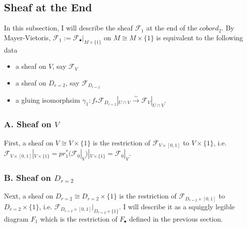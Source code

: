 \subsection{Sheaf at the End}
In this subsection, I will describe the sheaf $\mathscr{F}_1$ at the end of the $cobord_2$. By Mayer-Vietoris, $\mathscr{F}_1:= \mathscr{F}_\bullet|_{M\times\{1\}}$ on $M \cong M\times\{1\}$ is equivalent to the following data
\begin{itemize}
\item a sheaf on $V$, say $\mathscr{F}_{V}$

\item a sheaf on $D_{r=2}$, say $\mathscr{F}_{D_{r=2}}$

\item a gluing isomorphsim $\gamma_1 : f_*\mathscr{F}_{D_{r=2}}|_{U\cap V} \xrightarrow{\sim} \mathscr{F}_{V}|_{U\cap V}$.
\end{itemize}

\subsubsection{A. Sheaf on $V$}
First, a sheaf on $V\cong V\times\{1\}$ is the restriction of $\mathscr{F}_{V\times [0,1]}$ to $V\times \{1\}$, i.e. $\mathscr{F}_{V\times [0,1]}|_{V\times \{1\}}= pr_1^*(\mathscr{F}_0|_V)|_{V\times \{1\}} = \mathscr{F}_0|_V$.
\subsubsection{B. Sheaf on $D_{r=2}$}
Next, a sheaf on $D_{r=2}\cong D_{r=2}\times \{1\}$ is the restriction of $\mathscr{F}_{D_{r=2}\times [0,1]}$ to $D_{r=2}\times \{1\}$, i.e. $\mathscr{F}_{D_{r=2}\times [0,1]} |_{D_{r=2}\times \{1\}}$. I will describe it as a squiggly legible diagram $F_1$ which is the restriction of $F_\bullet$ defined in the previous section.

